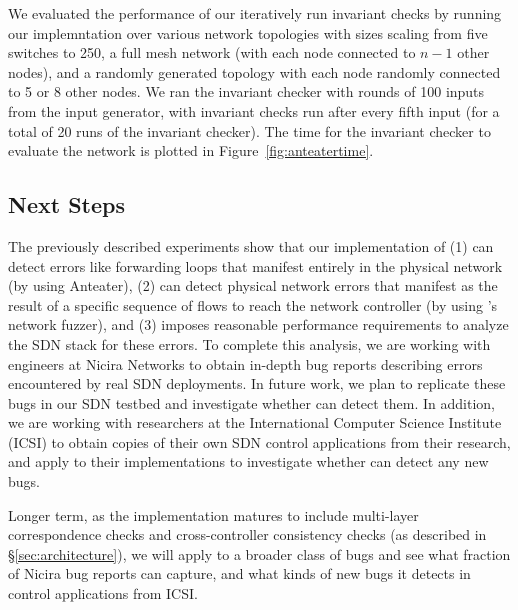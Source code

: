    We evaluated the performance of our iteratively run invariant checks by running our implemntation over various network topologies with sizes scaling from five switches to 250, a full mesh network (with each node connected to $n - 1$ other nodes), and a randomly generated topology with each node randomly connected to 5 or 8 other nodes.
    We ran the invariant checker with rounds of 100 inputs from the input generator, with invariant checks run after every fifth input (for a total of 20 runs of the invariant checker).
    The time for the invariant checker to evaluate the network is plotted in Figure~\ref{fig:anteatertime}.
   

    \subsection{Next Steps}
        The previously described experiments show that our implementation of \projectname{} (1) can detect errors like forwarding loops that manifest entirely in the physical network (by using Anteater), (2) can detect physical network errors that manifest as the result of a specific sequence of flows to reach the network controller (by using \projectname{}'s network fuzzer), and (3) imposes reasonable performance requirements to analyze the SDN stack for these errors.
        To complete this analysis, we are working with engineers at Nicira Networks to obtain in-depth bug reports describing errors encountered by real SDN deployments.
        In future work, we plan to replicate these bugs in our SDN testbed and investigate whether \projectname{} can detect them.
        In addition, we are working with researchers at the International Computer Science Institute (ICSI) to obtain copies of their own SDN control applications from their research, and apply \projectname{} to their implementations to investigate whether \projectname{} can detect any new bugs.

        Longer term, as the \projectname{} implementation matures to include multi-layer correspondence checks and cross-controller consistency checks (as described in \S\ref{sec:architecture}), we will apply \projectname{} to a broader class of bugs and see what fraction of Nicira bug reports \projectname{} can capture, and what kinds of new bugs it detects in control applications from ICSI. 


